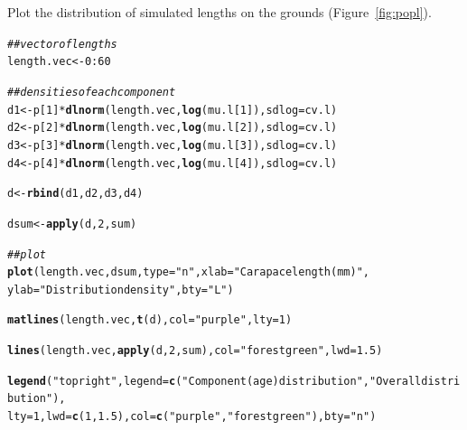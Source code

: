 \documentclass[12pt]{article}\usepackage[]{graphicx}\usepackage[]{color}
\makeatletter
\newcommand{\hlnum}[1]{\textcolor[rgb]{0.686,0.059,0.569}{#1}}%
\newcommand{\hlstr}[1]{\textcolor[rgb]{0.192,0.494,0.8}{#1}}%
\newcommand{\hlcom}[1]{\textcolor[rgb]{0.678,0.584,0.686}{\textit{#1}}}%
\newcommand{\hlopt}[1]{\textcolor[rgb]{0,0,0}{#1}}%
\newcommand{\hlstd}[1]{\textcolor[rgb]{0.345,0.345,0.345}{#1}}%
\newcommand{\hlkwb}[1]{\textcolor[rgb]{0.69,0.353,0.396}{#1}}%
\newcommand{\hlkwc}[1]{\textcolor[rgb]{0.333,0.667,0.333}{#1}}%
\newcommand{\hlkwd}[1]{\textcolor[rgb]{0.737,0.353,0.396}{\textbf{#1}}}%
\newenvironment{kframe}{%
 \def\at@end@of@kframe{}%
 \ifinner\ifhmode%
  \def\at@end@of@kframe{\end{minipage}}%
  \begin{minipage}{\columnwidth}%
 \fi\fi%
 \def\FrameCommand##1{\hskip\@totalleftmargin \hskip-\fboxsep
 \colorbox{shadecolor}{##1}\hskip-\fboxsep
     \hskip-\linewidth \hskip-\@totalleftmargin \hskip\columnwidth}%
 \MakeFramed {\advance\hsize-\width
   \@totalleftmargin\z@ \linewidth\hsize
   \@setminipage}}%
 {\par\unskip\endMakeFramed%
 \at@end@of@kframe}
\newenvironment{knitrout}{}{} %
\makeatother
\begin{document}
Plot the distribution of simulated lengths on the grounds (Figure~\ref{fig:popl}).
\begin{knitrout}\footnotesize
{}\color{fgcolor}\begin{kframe}
\begin{alltt}
\hlcom{## vector of lengths}
\hlstd{length.vec} \hlkwb{<-} \hlnum{0}\hlopt{:}\hlnum{60}

\hlcom{## densities of each component}
\hlstd{d1} \hlkwb{<-} \hlstd{p[}\hlnum{1}\hlstd{]} \hlopt{*} \hlkwd{dlnorm}\hlstd{(length.vec,} \hlkwd{log}\hlstd{(mu.l[}\hlnum{1}\hlstd{]),} \hlkwc{sdlog} \hlstd{= cv.l)}
\hlstd{d2} \hlkwb{<-} \hlstd{p[}\hlnum{2}\hlstd{]} \hlopt{*} \hlkwd{dlnorm}\hlstd{(length.vec,} \hlkwd{log}\hlstd{(mu.l[}\hlnum{2}\hlstd{]),} \hlkwc{sdlog} \hlstd{= cv.l)}
\hlstd{d3} \hlkwb{<-} \hlstd{p[}\hlnum{3}\hlstd{]} \hlopt{*} \hlkwd{dlnorm}\hlstd{(length.vec,} \hlkwd{log}\hlstd{(mu.l[}\hlnum{3}\hlstd{]),} \hlkwc{sdlog} \hlstd{= cv.l)}
\hlstd{d4} \hlkwb{<-} \hlstd{p[}\hlnum{4}\hlstd{]} \hlopt{*} \hlkwd{dlnorm}\hlstd{(length.vec,} \hlkwd{log}\hlstd{(mu.l[}\hlnum{4}\hlstd{]),} \hlkwc{sdlog} \hlstd{= cv.l)}

\hlstd{d} \hlkwb{<-} \hlkwd{rbind}\hlstd{(d1, d2, d3, d4)}

\hlstd{dsum} \hlkwb{<-} \hlkwd{apply}\hlstd{(d,} \hlnum{2}\hlstd{, sum)}

\hlcom{## plot}
\hlkwd{plot}\hlstd{(length.vec, dsum,} \hlkwc{type} \hlstd{=} \hlstr{"n"}\hlstd{,} \hlkwc{xlab} \hlstd{=} \hlstr{"Carapace length (mm)"}\hlstd{,}
     \hlkwc{ylab} \hlstd{=} \hlstr{"Distribution density"}\hlstd{,} \hlkwc{bty} \hlstd{=} \hlstr{"L"}\hlstd{)}

\hlkwd{matlines}\hlstd{(length.vec,} \hlkwd{t}\hlstd{(d),} \hlkwc{col} \hlstd{=} \hlstr{"purple"}\hlstd{,} \hlkwc{lty} \hlstd{=} \hlnum{1}\hlstd{)}

\hlkwd{lines}\hlstd{(length.vec,} \hlkwd{apply}\hlstd{(d,} \hlnum{2}\hlstd{, sum),} \hlkwc{col} \hlstd{=} \hlstr{"forestgreen"}\hlstd{,} \hlkwc{lwd} \hlstd{=} \hlnum{1.5}\hlstd{)}

\hlkwd{legend}\hlstd{(}\hlstr{"topright"}\hlstd{,} \hlkwc{legend} \hlstd{=} \hlkwd{c}\hlstd{(}\hlstr{"Component (age) distribution"}\hlstd{,} \hlstr{"Overall distribution"}\hlstd{),}
       \hlkwc{lty} \hlstd{=} \hlnum{1}\hlstd{,} \hlkwc{lwd} \hlstd{=} \hlkwd{c}\hlstd{(}\hlnum{1}\hlstd{,} \hlnum{1.5}\hlstd{),} \hlkwc{col} \hlstd{=} \hlkwd{c}\hlstd{(}\hlstr{"purple"}\hlstd{,} \hlstr{"forestgreen"}\hlstd{),} \hlkwc{bty} \hlstd{=} \hlstr{"n"}\hlstd{)}
\end{alltt}
\end{kframe}\begin{figure}


\end{figure}
\end{knitrout}
\end{document}
